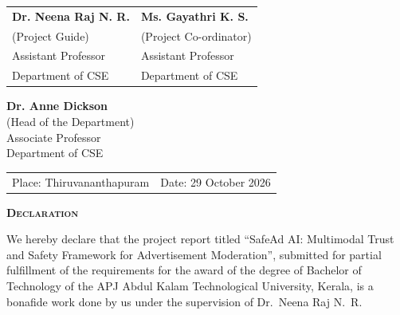 \documentclass[12pt,a4paper]{report}
\begin{document}
\vspace{1.8cm}

\noindent
\begin{singlespacing}
\begin{tabular}{@{}p{}@{}p{}@{}}
\textbf{Dr. Neena Raj N. R.} & \textbf{Ms. Gayathri K. S.} \\
(Project Guide) & (Project Co-ordinator) \\
Assistant Professor & Assistant Professor \\
Department of CSE & Department of CSE \\
\end{tabular}

\vspace{1.5cm}

\begin{center}
\textbf{Dr. Anne Dickson}\\
(Head of the Department)\\
Associate Professor\\
Department of CSE
\end{center}

\vspace{1.0cm}

\noindent
\begin{tabular}{@{}p{}@{}p{}@{}}
Place: Thiruvananthapuram & Date: 29 October 2026
\end{tabular}
\end{singlespacing}


\newpage

\begin{center}
    \textbf{\Large \textsc{Declaration}}
\end{center}

\vspace{0.4cm}

\noindent
We hereby declare that the project report titled ``SafeAd AI: Multimodal Trust and Safety Framework for Advertisement Moderation'', submitted for partial fulfillment of the requirements for the award of the degree of Bachelor of Technology of the APJ Abdul Kalam Technological University, Kerala, is a bonafide work done by us under the supervision of Dr.~Neena Raj N.~R.

\par
\vspace{0.3cm}
\end{document}
